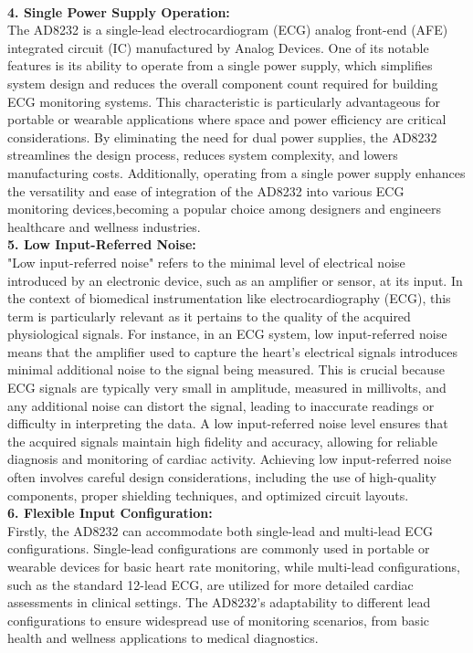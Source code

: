 \\
\textbf{4. Single Power Supply Operation: }
\\
The AD8232 is a single-lead electrocardiogram (ECG) analog front-end (AFE) integrated circuit (IC) manufactured by Analog Devices. One of its notable features is its ability to operate from a single power supply, which simplifies system design and reduces the overall component count required for building ECG monitoring systems. This characteristic is particularly advantageous for portable or wearable applications where space and power efficiency are critical considerations. By eliminating the need for dual power supplies, the AD8232 streamlines the design process, reduces system complexity, and lowers manufacturing costs. Additionally, operating from a single power supply enhances the versatility and ease of integration of the AD8232 into various ECG monitoring devices,becoming a popular choice among designers and engineers healthcare and wellness industries.
\\
\textbf{5. Low Input-Referred Noise: }
\\
"Low input-referred noise" refers to the minimal level of electrical noise introduced by an electronic device, such as an amplifier or sensor, at its input. In the context of biomedical instrumentation like electrocardiography (ECG), this term is particularly relevant as it pertains to the quality of the acquired physiological signals.
For instance, in an ECG system, low input-referred noise means that the amplifier used to capture the heart's electrical signals\cite{ksibi2023electroencephalography} introduces minimal additional noise to the signal being measured. This is crucial because ECG signals are typically very small in amplitude, measured in millivolts, and any additional noise can distort the signal, leading to inaccurate readings or difficulty in interpreting the data.
A low input-referred noise level ensures that the acquired signals maintain high fidelity and accuracy, allowing for reliable diagnosis and monitoring of cardiac activity. Achieving low input-referred noise often involves careful design considerations, including the use of high-quality components, proper shielding techniques, and optimized circuit layouts.
\\
\textbf{6. Flexible Input Configuration:}
\\
Firstly, the AD8232 can accommodate both single-lead and multi-lead ECG configurations. Single-lead configurations are commonly used in portable or wearable devices for basic heart rate monitoring, while multi-lead configurations, such as the standard 12-lead ECG, are utilized for more detailed cardiac assessments in clinical settings. The AD8232's adaptability to different lead configurations to ensure widespread use of monitoring scenarios, from basic health and wellness applications to medical diagnostics.
